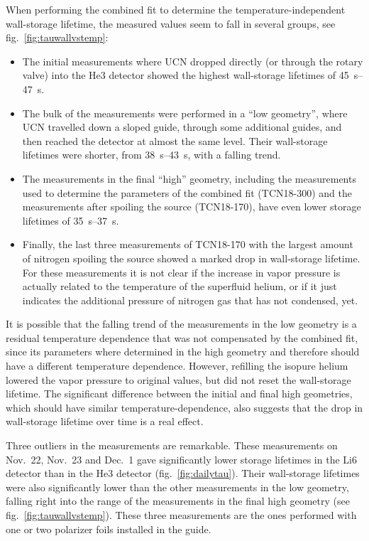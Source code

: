 \documentclass[10pt,letterpaper]{article}
\begin{document}
When performing the combined fit to determine the temperature-independent wall-storage lifetime, the measured values seem to fall in several groups, see fig.~\ref{fig:tauwallvstemp}:
\begin{itemize}
\item The initial measurements where UCN dropped directly (or through the rotary valve) into the He3 detector showed the highest wall-storage lifetimes of \SIrange{45}{47}{\second}.
\item The bulk of the measurements were performed in a ``low geometry'', where UCN travelled down a sloped guide, through some additional guides, and then reached the detector at almost the same level. Their wall-storage lifetimes were shorter, from \SIrange{38}{43}{\second}, with a falling trend.
\item The measurements in the final ``high'' geometry, including the measurements used to determine the parameters of the combined fit (TCN18-300) and the measurements after spoiling the source (TCN18-170), have even lower storage lifetimes of \SIrange{35}{37}{\second}.
\item Finally, the last three measurements of TCN18-170 with the largest amount of nitrogen spoiling the source showed a marked drop in wall-storage lifetime. For these measurements it is not clear if the increase in vapor pressure is actually related to the temperature of the superfluid helium, or if it just indicates the additional pressure of nitrogen gas that has not condensed, yet.
\end{itemize}

It is possible that the falling trend of the measurements in the low geometry is a residual temperature dependence that was not compensated by the combined fit, since its parameters where determined in the high geometry and therefore should have a different temperature dependence. However, refilling the isopure helium lowered the vapor pressure to original values, but did not reset the wall-storage lifetime. The significant difference between the initial and final high geometries, which should have similar temperature-dependence, also suggests that the drop in wall-storage lifetime over time is a real effect.

Three outliers in the measurements are remarkable. These measurements on Nov.~22, Nov.~23 and Dec.~1 gave significantly lower storage lifetimes in the Li6 detector than in the He3 detector (fig.~\ref{fig:dailytau}). Their wall-storage lifetimes were also significantly lower than the other measurements in the low geometry, falling right into the range of the measurements in the final high geometry (see fig.~\ref{fig:tauwallvstemp}). These three measurements are the ones performed with one or two polarizer foils installed in the guide.
\end{document}
